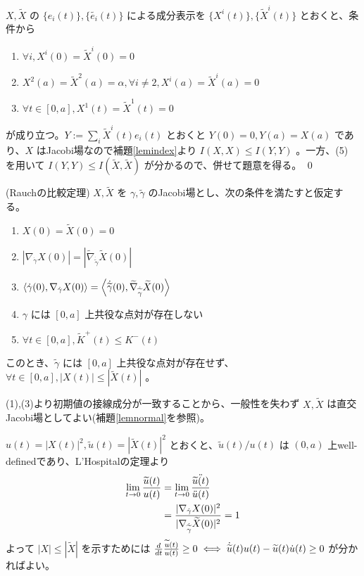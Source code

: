 \documentclass[dvipdfmx,a4paper]{jsreport}
\theoremstyle{definition}
\renewcommand{\tilde}{\widetilde}
\begin{document}
$X,\tilde{X}$ の $\{e_i(t)\},\{\tilde{e_i}(t)\}$ による成分表示を $\{X^i(t)\},\{\tilde{X}^i(t)\}$ とおくと、条件から
\begin{enumerate}
    \item $\forall i,X^i(0)=\tilde{X}^i(0)=0$
    \item $X^2(a)=\tilde{X}^2(a)=\alpha,\forall i \neq 2,X^i(a)=\tilde{X}^i(a)=0$
    \item $\forall t\in [0,a],X^1(t)=\tilde{X}^1(t)=0$ 
\end{enumerate}

が成り立つ。$Y:=\sum_i \tilde{X}^i(t)e_i(t)$ とおくと $Y(0)=0,Y(a)=X(a)$ であり、$X$ はJacobi場なので補題\ref{lemindex}より $I(X,X) \leq I(Y,Y)$ 。一方、(5) を用いて $I(Y,Y) \leq I(\tilde{X},\tilde{X})$ が分かるので、併せて題意を得る。 \qed 

\thm\label{thmrauch} (Rauchの比較定理) $X,\tilde{X}$ を $\gamma,\tilde{\gamma}$ のJacobi場とし、次の条件を満たすと仮定する。
\begin{enumerate}
    \item $X(0)=\tilde{X}(0)=0$
    \item $|\nabla_{\dot{\gamma}} X(0)|=|\tilde{\nabla}_{\dot{\tilde{\gamma}}} \tilde{X}(0)|$
    \item $\ev{\dot{\gamma}(0),\nabla_{\dot{\gamma}}X(0)}=\ev{\dot{\tilde{\gamma}}(0),\tilde{\nabla}_{\dot{\tilde{\gamma}}} \tilde{X}(0)}$
    \item $\gamma$ には $[0,a]$ 上共役な点対が存在しない
    \item $\forall t \in [0,a],\tilde{K}^+(t) \leq K^-(t)$ 
\end{enumerate}

このとき、$\tilde{\gamma}$ には $[0,a]$ 上共役な点対が存在せず、$\forall t\in [0,a],|X(t)|\leq |\tilde{X}(t)|$ 。

\prf (1),(3)より初期値の接線成分が一致することから、一般性を失わず $X,\tilde{X}$ は直交Jacobi場としてよい(補題\ref{lemnormal}を参照)。

$u(t)=|X(t)|^2,\tilde{u}(t)=|\tilde{X}(t)|^2$ とおくと、$\tilde{u}(t)/u(t)$ は $(0,a)$ 上well-definedであり、L'Hospitalの定理より
\begin{align*}
    \lim_{t \to 0}{{\tilde{u}(t)} \over {u}(t)} &= \lim_{t \to 0} {\ddot{\tilde{u}(t)} \over \ddot{u}(t)} \\
    &= {|\nabla_{\dot{\gamma}}X(0)|^2 \over |\nabla_{\dot{\tilde{\gamma}}}\tilde{X}(0)|^2}=1
\end{align*}
よって $|X| \leq |\tilde{X}|$ を示すためには ${d \over dt}{\tilde{u}(t) \over u(t)} \geq 0 \iff \dot{\tilde{u}}(t)u(t)-\tilde{u}(t)\dot{u}(t) \geq 0$ が分かればよい。
\end{document}
